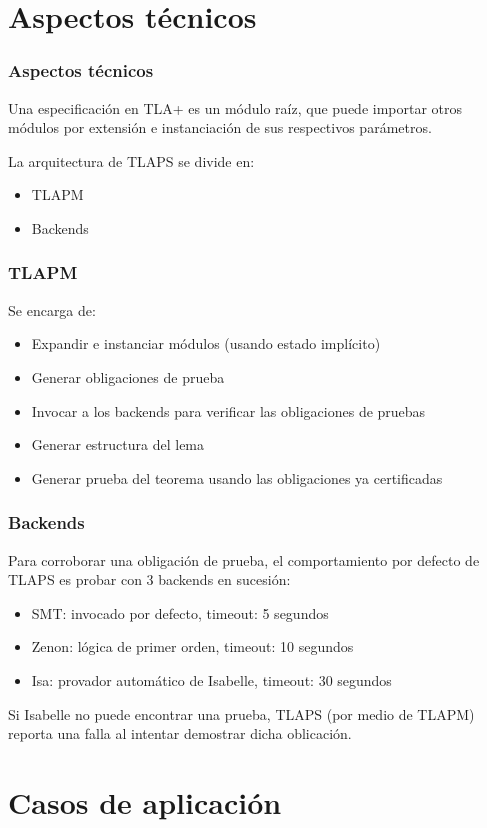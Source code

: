 \documentclass[12pt]{beamer}
\newenvironment{stepitemize}{\begin{itemize}[<+->]}{\end{itemize} }
\begin{document}
\section{Aspectos técnicos}
\begin{frame}
\frametitle{Aspectos técnicos}
  Una especificación en TLA+ es un módulo raíz, que puede importar otros módulos por extensión e instanciación de sus respectivos parámetros.
  \pause
  
  La arquitectura de TLAPS se divide en:
  \begin{stepitemize}
    \item TLAPM
    \item Backends
  \end{stepitemize}

\end{frame}

\begin{frame}
 \frametitle{TLAPM}
  Se encarga de:
 \begin{itemize}
  \item Expandir e instanciar módulos (usando estado implícito)
  \item Generar obligaciones de prueba
  \item Invocar a los backends para verificar las obligaciones de pruebas
  \item Generar estructura del lema
  \item Generar prueba del teorema usando las obligaciones ya certificadas
 \end{itemize}
\end{frame}

\begin{frame}
 \frametitle{Backends}
 Para corroborar una obligación de prueba, el comportamiento por defecto de TLAPS es probar con 3 backends en sucesión: 
 \begin{itemize}
  \item SMT: invocado por defecto, timeout: 5 segundos
  \item Zenon: lógica de primer orden, timeout: 10 segundos
  \item Isa: provador automático de Isabelle, timeout: 30 segundos
 \end{itemize}
  Si Isabelle no puede encontrar una prueba, TLAPS (por medio de TLAPM) reporta una falla al intentar demostrar dicha oblicación.
\end{frame}


\section{Casos de aplicación}
\end{document}
